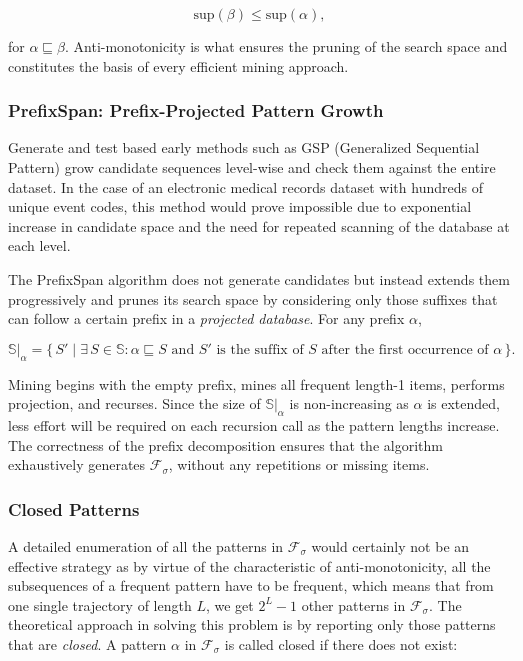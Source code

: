 \begin{equation}
    \mathrm{sup}(\beta) \leq \mathrm{sup}(\alpha),
    \label{eq:antimonotone}
\end{equation}

for $\alpha \sqsubseteq \beta$. Anti-monotonicity is what ensures the pruning of the search space and constitutes the basis of every efficient mining approach.

\subsubsection*{PrefixSpan: Prefix-Projected Pattern Growth}
\label{ch:prefix_span_theory}

Generate and test based early methods such as GSP (Generalized Sequential Pattern) grow candidate sequences level-wise and check them against the entire dataset. In the case of an electronic medical records dataset with hundreds of unique event codes, this method would prove impossible due to exponential increase in candidate space and the need for repeated scanning of the database at each level.

The PrefixSpan algorithm \cite{pei2001} does not generate candidates but instead extends them progressively and prunes its search space by considering only those suffixes that can follow a certain prefix in a \emph{projected database}. For any prefix $\alpha$,

\begin{equation}
    \mathbb{S}|_\alpha = \bigl\{\, S' \mid \exists\, S \in \mathbb{S}: \alpha \sqsubseteq S \text{ and } S' \text{ is the suffix of } S \text{ after the first occurrence of } \alpha \,\bigr\}.
    \label{eq:projection}
\end{equation}

Mining begins with the empty prefix, mines all frequent length-1 items, performs projection, and recurses. Since the size of $\mathbb{S}|_\alpha$ is non-increasing as $\alpha$ is extended, less effort will be required on each recursion call as the pattern lengths increase. The correctness of the prefix decomposition ensures that the algorithm exhaustively generates $\mathcal{F}_\sigma$, without any repetitions or missing items.

\subsubsection*{Closed Patterns}

A detailed enumeration of all the patterns in $\mathcal{F}_\sigma$ would certainly not be an effective strategy as by virtue of the characteristic of anti-monotonicity, all the subsequences of a frequent pattern have to be frequent, which means that from one single trajectory of length $L$, we get $2^L-1$ other patterns in $\mathcal{F}_\sigma$. The theoretical approach in solving this problem is by reporting only those patterns that are \emph{closed}. A pattern $\alpha$ in $\mathcal{F}_\sigma$ is called closed if there does not exist:

